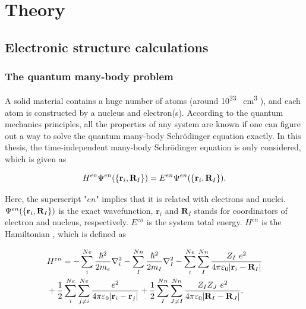 \documentclass[a4paper, 12pt, titlepage,oneside,drop]{kthesis}
\begin{document}
\chapter{Theory}

\section{Electronic structure calculations }
\label{ch:dft}

\subsection{The quantum many-body problem}
\label{ch:mb}

\noindent A solid material contains a huge number of atoms (around 10\textsuperscript{23} \si{\per\cubic\centi\metre} ), and each atom is constructed by a nucleus and electron(s). 
According to the quantum mechanics principles, all the properties of any system are known if one can figure out a way to solve 
the quantum many-body Schrödinger equation exactly. In this thesis, the time-independent many-body Schrödinger equation is only considered, which is given as

\begin{equation}\label{ssth}
 H^{en} {\Psi^{en}(\{ {\textbf r}_{i}, {\textbf R}_{I} \})} = {E^{en}} {\Psi^{en}(\{ {\textbf r}_{i}, {\textbf R}_{I} \})}.
\end{equation}


Here, the superscript "$en$" implies that it is related with electrons and nuclei. ${\Psi^{en}(\{ {\textbf r}_{i}, {\textbf R}_{I} \})}$ is the exact wavefunction, $\textbf{r}_{i}$ 
and $\textbf{R}_{I}$  stands for coordinators of electron and nucleus, respectively. $E^{en}$ is the system total energy. $H^{en}$ is the Hamiltonian \cite{martin2004electronic}, which is defined as

\begin{equation}\label{th}
\begin{split}
& H^{en} = - \sum\limits_i^{Ne} {\frac{\hbar^{2}}{2 m_{e}}}   \nablaia<i> - \sum\limits_I^{Nn} {\frac{\hbar^{2}}{2 m_{I}}} \nablaia<I>  - \sum\limits_i^{Ne} \sum\limits_I^{Nn} \frac{Z_{I}\ e^2}{4 \pi \varepsilon_0 |\textbf{r}_{i}-\textbf{R}_{I}|} \\
& + \frac{1}{2} \sum\limits_i^{Ne} \sum\limits_{j \neq i}^{Ne} \frac{ e^2}{4 \pi \varepsilon_0 |\textbf{r}_{i}-\textbf{r}_{j}|} + \frac{1}{2} \sum\limits_I^{Nn} \sum\limits_{J \neq I}^{Nn} \frac{Z_{I} Z_{J}\  e^2}{4 \pi \varepsilon_0 |\textbf{R}_{I}-\textbf{R}_{J}|}.
\end{split}
\end{equation}
\end{document}
